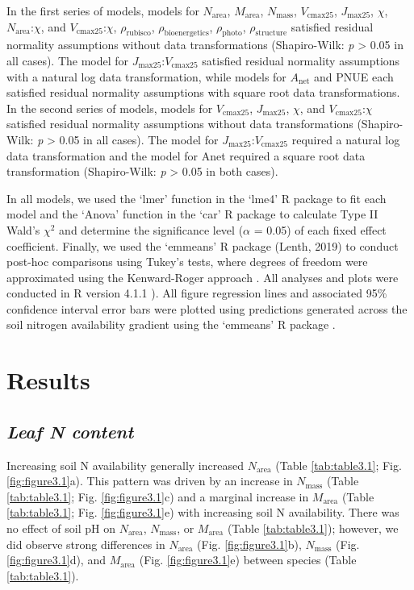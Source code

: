     In the first series of models, models for $N_\mathrm{area}$, $M_\mathrm{area}$, $N_\mathrm{mass}$, $V_\mathrm{cmax25}$, $J_\mathrm{max25}$, $\chi$, $N_{\mathrm{area}}$:$\chi$, and $V_{\mathrm{cmax25}}$:$\chi$, $\rho_\mathrm{rubisco}$, $\rho_\mathrm{bioenergetics}$, $\rho_\mathrm{photo}$, $\rho_\mathrm{structure}$ satisfied residual normality assumptions without data transformations (Shapiro-Wilk: \textit{p} > 0.05 in all cases). The model for $J_\mathrm{max25}$:$V_\mathrm{cmax25}$ satisfied residual normality assumptions with a natural log data transformation, while models for $A_\mathrm{net}$ and PNUE each satisfied residual normality assumptions with square root data transformations. In the second series of models, models for $V_\mathrm{cmax25}$, $J_\mathrm{max25}$, $\chi$, and $V_{\mathrm{cmax25}}$:$\chi$ satisfied residual normality assumptions without data transformations (Shapiro-Wilk: \textit{p} > 0.05 in all cases). The model for $J_\mathrm{max25}$:$V_\mathrm{cmax25}$ required a natural log data transformation and the model for Anet required a square root data transformation (Shapiro-Wilk: \textit{p} > 0.05 in both cases).
    
    In all models, we used the ‘lmer’ function in the ‘lme4’ R package  to fit each model and the ‘Anova’ function in the ‘car’ R package  to calculate Type II Wald’s $\chi\mathrm{^{2}}$ and determine the significance level ($\alpha$ = 0.05) of each fixed effect coefficient. Finally, we used the ‘emmeans’ R package (Lenth, 2019) to conduct post-hoc comparisons using Tukey’s tests, where degrees of freedom were approximated using the Kenward-Roger approach . All analyses and plots were conducted in R version 4.1.1 ). All figure regression lines and associated 95\% confidence interval error bars were plotted using predictions generated across the soil nitrogen availability gradient using the ‘emmeans’ R package .
    
    \section{Results}

    \subsection{\textit{Leaf N content}}
    
    Increasing soil N availability generally increased $N_\mathrm{area}$ (Table \ref{tab:table3.1}; Fig. \ref{fig:figure3.1}a). This pattern was driven by an increase in $N_\mathrm{mass}$ (Table \ref{tab:table3.1}; Fig. \ref{fig:figure3.1}c) and a marginal increase in $M_\mathrm{area}$ (Table \ref{tab:table3.1}; Fig. \ref{fig:figure3.1}e) with increasing soil N availability. There was no effect of soil pH on $N_\mathrm{area}$, $N_\mathrm{mass}$, or $M_\mathrm{area}$ (Table \ref{tab:table3.1}); however, we did observe strong differences in $N_\mathrm{area}$ (Fig. \ref{fig:figure3.1}b), $N_\mathrm{mass}$ (Fig. \ref{fig:figure3.1}d), and $M_\mathrm{area}$ (Fig. \ref{fig:figure3.1}e) between species (Table \ref{tab:table3.1}).
    \clearpage

